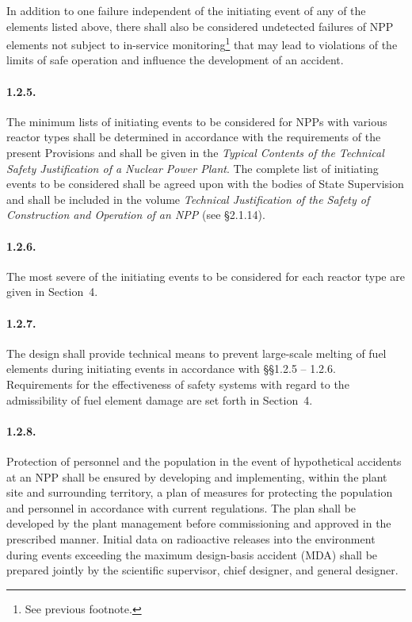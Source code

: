 \documentclass[openright]{bookest}
\begin{document}
In addition to one failure independent of the initiating event of any of the elements listed above, there shall also be considered undetected failures of NPP elements not subject to in-service monitoring\footnote{See previous footnote.} that may lead to violations of the limits of safe operation and influence the development of an accident.

\paragraph{1.2.5.}
The minimum lists of initiating events to be considered for NPPs with various reactor types shall be determined in accordance with the requirements of the present Provisions and shall be given in the \textit{Typical Contents of the Technical Safety Justification of a Nuclear Power Plant}. The complete list of initiating events to be considered shall be agreed upon with the bodies of State Supervision and shall be included in the volume \textit{Technical Justification of the Safety of Construction and Operation of an NPP} (see §2.1.14).

\paragraph{1.2.6.}
The most severe of the initiating events to be considered for each reactor type are given in Section~4.

\paragraph{1.2.7.}
The design shall provide technical means to prevent large-scale melting of fuel elements during initiating events in accordance with §§1.2.5 -- 1.2.6. Requirements for the effectiveness of safety systems with regard to the admissibility of fuel element damage are set forth in Section~4.

\paragraph{1.2.8.}
Protection of personnel and the population in the event of hypothetical accidents at an NPP shall be ensured by developing and implementing, within the plant site and surrounding territory, a plan of measures for protecting the population and personnel in accordance with current regulations. The plan shall be developed by the plant management before commissioning and approved in the prescribed manner. Initial data on radioactive releases into the environment during events exceeding the maximum design-basis accident (MDA) shall be prepared jointly by the scientific supervisor, chief designer, and general designer.
\end{document}
